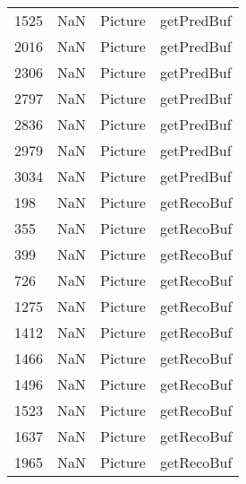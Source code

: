 \begin{tabular}{llll}
1525 &                   NaN &                    Picture &                                getPredBuf \\
2016 &                   NaN &                    Picture &                                getPredBuf \\
2306 &                   NaN &                    Picture &                                getPredBuf \\
2797 &                   NaN &                    Picture &                                getPredBuf \\
2836 &                   NaN &                    Picture &                                getPredBuf \\
2979 &                   NaN &                    Picture &                                getPredBuf \\
3034 &                   NaN &                    Picture &                                getPredBuf \\
198  &                   NaN &                    Picture &                                getRecoBuf \\
355  &                   NaN &                    Picture &                                getRecoBuf \\
399  &                   NaN &                    Picture &                                getRecoBuf \\
726  &                   NaN &                    Picture &                                getRecoBuf \\
1275 &                   NaN &                    Picture &                                getRecoBuf \\
1412 &                   NaN &                    Picture &                                getRecoBuf \\
1466 &                   NaN &                    Picture &                                getRecoBuf \\
1496 &                   NaN &                    Picture &                                getRecoBuf \\
1523 &                   NaN &                    Picture &                                getRecoBuf \\
1637 &                   NaN &                    Picture &                                getRecoBuf \\
1965 &                   NaN &                    Picture &                                getRecoBuf \\

\end{tabular}
